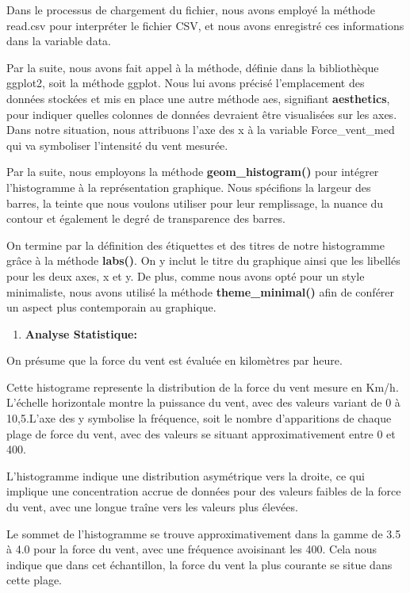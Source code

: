 \documentclass[
]{article}
\providecommand{\tightlist}{%
  \setlength{\itemsep}{0pt}\setlength{\parskip}{0pt}}
\begin{document}
Dans le processus de chargement du fichier, nous avons employé la
méthode read.csv pour interpréter le fichier CSV, et nous avons
enregistré ces informations dans la variable data.

Par la suite, nous avons fait appel à la méthode, définie dans la
bibliothèque ggplot2, soit la méthode ggplot. Nous lui avons précisé
l'emplacement des données stockées et mis en place une autre méthode
aes, signifiant \textbf{aesthetics}, pour indiquer quelles colonnes de
données devraient être visualisées sur les axes. Dans notre situation,
nous attribuons l'axe des x à la variable Force\_vent\_med qui va
symboliser l'intensité du vent mesurée.

Par la suite, nous employons la méthode \textbf{geom\_histogram()} pour
intégrer l'histogramme à la représentation graphique. Nous spécifions la
largeur des barres, la teinte que nous voulons utiliser pour leur
remplissage, la nuance du contour et également le degré de transparence
des barres.

On termine par la définition des étiquettes et des titres de notre
histogramme grâce à la méthode \textbf{labs()}. On y inclut le titre du
graphique ainsi que les libellés pour les deux axes, x et y. De plus,
comme nous avons opté pour un style minimaliste, nous avons utilisé la
méthode \textbf{theme\_minimal()} afin de conférer un aspect plus
contemporain au graphique.

\begin{enumerate}
\def\labelenumi{\arabic{enumi}.}
\setcounter{enumi}{1}
\tightlist
\item
  \textbf{Analyse Statistique:}
\end{enumerate}

On présume que la force du vent est évaluée en kilomètres par heure.

Cette histograme represente la distribution de la force du vent mesure
en Km/h. L'échelle horizontale montre la puissance du vent, avec des
valeurs variant de 0 à 10,5.L'axe des y symbolise la fréquence, soit le
nombre d'apparitions de chaque plage de force du vent, avec des valeurs
se situant approximativement entre 0 et 400.

L'histogramme indique une distribution asymétrique vers la droite, ce
qui implique une concentration accrue de données pour des valeurs
faibles de la force du vent, avec une longue traîne vers les valeurs
plus élevées.

Le sommet de l'histogramme se trouve approximativement dans la gamme de
3.5 à 4.0 pour la force du vent, avec une fréquence avoisinant les 400.
Cela nous indique que dans cet échantillon, la force du vent la plus
courante se situe dans cette plage.
\end{document}
